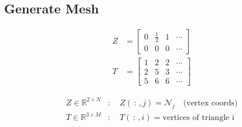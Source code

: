 \subsection{Generate Mesh}
    \begin{minipage}{0.49\linewidth}
    \end{minipage}
    \begin{minipage}{0.48\linewidth}
        \vspace{-0.5em}
        \begin{align*}
            Z &= 
            \begin{bmatrix}
                0 & \frac{1}{2} & 1 & \cdots\\
                0 & 0 & 0 & \cdots
            \end{bmatrix}\\
            T &= 
            \begin{bmatrix}
                1 & 2 & 2 & \cdots\\
                2 & 5 & 3 & \cdots\\
                5 & 6 & 6 & \cdots
            \end{bmatrix}
        \end{align*}
    \end{minipage}
    \begin{align*}
        Z \in \mathbb{R}^{2\times N}&: \quad Z(\, :\, ,j)=\mathcal{N}_j \quad \textrm{(vertex coords)}\\
        T \in \mathbb{R}^{3\times M}&: \quad T(\, :\, ,i)=\textrm{vertices of triangle i}
    \end{align*}